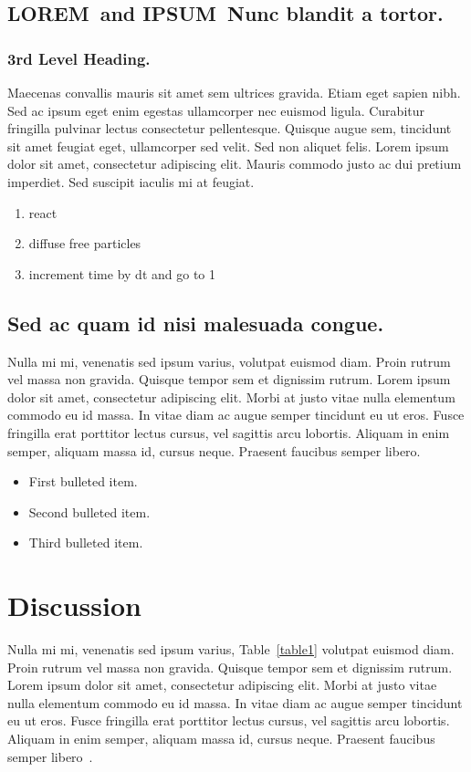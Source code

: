 \documentclass[10pt,letterpaper]{article}
\newcommand{\lorem}{{\bf LOREM}}
\newcommand{\ipsum}{{\bf IPSUM}}
\begin{document}
\subsection*{\lorem\ and \ipsum\ Nunc blandit a tortor.}
\subsubsection*{3rd Level Heading.} 
Maecenas convallis mauris sit amet sem ultrices gravida. Etiam eget sapien nibh. Sed ac ipsum eget enim egestas ullamcorper nec euismod ligula. Curabitur fringilla pulvinar lectus consectetur pellentesque. Quisque augue sem, tincidunt sit amet feugiat eget, ullamcorper sed velit. Sed non aliquet felis. Lorem ipsum dolor sit amet, consectetur adipiscing elit. Mauris commodo justo ac dui pretium imperdiet. Sed suscipit iaculis mi at feugiat. 

\begin{enumerate}
	\item{react}
	\item{diffuse free particles}
	\item{increment time by dt and go to 1}
\end{enumerate}


\subsection*{Sed ac quam id nisi malesuada congue.}

Nulla mi mi, venenatis sed ipsum varius, volutpat euismod diam. Proin rutrum vel massa non gravida. Quisque tempor sem et dignissim rutrum. Lorem ipsum dolor sit amet, consectetur adipiscing elit. Morbi at justo vitae nulla elementum commodo eu id massa. In vitae diam ac augue semper tincidunt eu ut eros. Fusce fringilla erat porttitor lectus cursus, vel sagittis arcu lobortis. Aliquam in enim semper, aliquam massa id, cursus neque. Praesent faucibus semper libero.

\begin{itemize}
	\item First bulleted item.
	\item Second bulleted item.
	\item Third bulleted item.
\end{itemize}

\section*{Discussion}
Nulla mi mi, venenatis sed ipsum varius, Table~\ref{table1} volutpat euismod diam. Proin rutrum vel massa non gravida. Quisque tempor sem et dignissim rutrum. Lorem ipsum dolor sit amet, consectetur adipiscing elit. Morbi at justo vitae nulla elementum commodo eu id massa. In vitae diam ac augue semper tincidunt eu ut eros. Fusce fringilla erat porttitor lectus cursus, vel sagittis arcu lobortis. Aliquam in enim semper, aliquam massa id, cursus neque. Praesent faucibus semper libero~\cite{bib3}.
\end{document}
